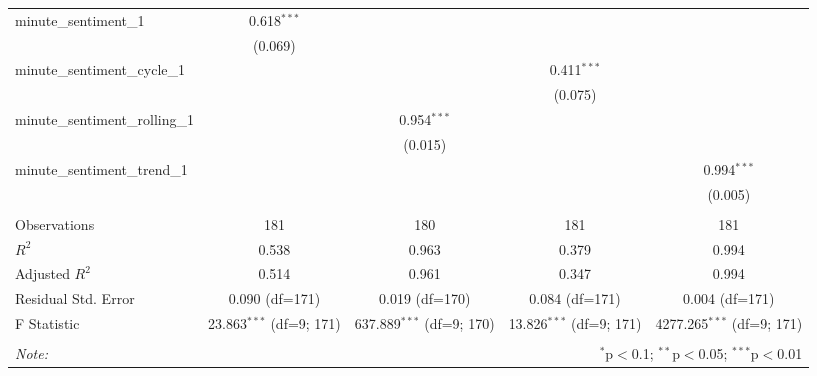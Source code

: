 \documentclass[12pt, letterpaper]{article}
\begin{document}
\begin{table}[H]
\begin{adjustbox}{width=\textwidth}
\begin{tabular}{@{\extracolsep{5pt}}lcccc}
    minute\_sentiment\_1 & 0.618$^{***}$ & & & \\
    & (0.069) & & & \\
    minute\_sentiment\_cycle\_1 & & & 0.411$^{***}$ & \\
    & & & (0.075) & \\
    minute\_sentiment\_rolling\_1 & & 0.954$^{***}$ & & \\
    & & (0.015) & & \\
    minute\_sentiment\_trend\_1 & & & & 0.994$^{***}$ \\
    & & & & (0.005) \\
    \hline \\[-1.8ex]
    Observations & 181 & 180 & 181 & 181 \\
    $R^2$ & 0.538 & 0.963 & 0.379 & 0.994 \\
    Adjusted $R^2$ & 0.514 & 0.961 & 0.347 & 0.994 \\
    Residual Std. Error & 0.090 (df=171) & 0.019 (df=170) & 0.084 (df=171) & 0.004 (df=171) \\
    F Statistic & 23.863$^{***}$ (df=9; 171) & 637.889$^{***}$ (df=9; 170) & 13.826$^{***}$ (df=9; 171) & 4277.265$^{***}$ (df=9; 171) \\
    \hline
    \hline \\[-1.8ex]
    \textit{Note:} & \multicolumn{4}{r}{$^{*}$p$<$0.1; $^{**}$p$<$0.05; $^{***}$p$<$0.01} \\
    \end{tabular}
    \end{adjustbox}
    \end{table}
    
\end{document}
